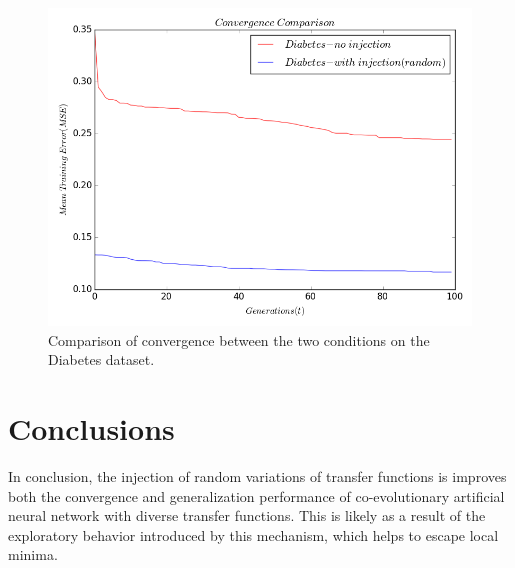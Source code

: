 \documentclass[12pt]{article} %
\begin{document}
\begin{figure}[here]
\includegraphics[scale=0.6]{errs_no_inject_convergence_Diabetes.png}
\caption{\label{Convergence_cancer_injection} Comparison of convergence between the two conditions on the Diabetes dataset.}
\end{figure}

\section{Conclusions}
In conclusion, the injection of random variations of transfer functions is improves both the convergence and generalization performance of co-evolutionary artificial neural network with diverse transfer functions. This is likely as a result of the exploratory behavior introduced by this mechanism, which helps to escape local minima.
\end{document}
